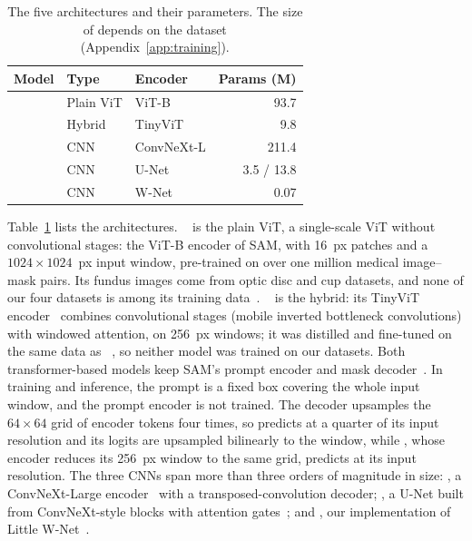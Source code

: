 \begin{table}[tb]
\caption{The five architectures and their parameters. The size of \convunext{} depends on the dataset (Appendix~\ref{app:training}).}
\label{tab:model_matrix}
\begin{ruledtabular}
\begin{tabular}{lllr}
Model & Type & Encoder & Params (M) \\
\midrule
\medsam{} & Plain ViT & ViT-B & 93.7 \\
\litemedsam{} & Hybrid & TinyViT & 9.8 \\
\convnext{} & CNN & ConvNeXt-L & 211.4 \\
\convunext{} & CNN & U-Net & 3.5 / 13.8 \\
\lwnet{} & CNN & W-Net & 0.07 \\
\end{tabular}
\end{ruledtabular}
\end{table}

Table~\ref{tab:model_matrix} lists the architectures. \medsam{}~\cite{ma2024segment} is the plain ViT, a single-scale ViT without convolutional stages: the ViT-B encoder of SAM, with 16~px patches and a $1024 \times 1024$~px input window, pre-trained on over one million medical image--mask pairs. Its fundus images come from optic disc and cup datasets, and none of our four datasets is among its training data~\cite{ma2024segment}. \litemedsam{}~\cite{ma2024efficient} is the hybrid: its TinyViT encoder~\cite{wu2022tinyvit} combines convolutional stages (mobile inverted bottleneck convolutions) with windowed attention, on 256~px windows; it was distilled and fine-tuned on the same data as \medsam{}~\cite{ma2024efficient}, so neither model was trained on our datasets. Both transformer-based models keep SAM's prompt encoder and mask decoder~\cite{Kirillov_2023_ICCV}. In training and inference, the prompt is a fixed box covering the whole input window, and the prompt encoder is not trained. The decoder upsamples the $64 \times 64$ grid of encoder tokens four times, so \medsam{} predicts at a quarter of its input resolution and its logits are upsampled bilinearly to the window, while \litemedsam{}, whose encoder reduces its 256~px window to the same grid, predicts at its input resolution. The three CNNs span more than three orders of magnitude in size: \convnext{}, a ConvNeXt-Large encoder~\cite{liu2022convnet} with a transposed-convolution decoder; \convunext{}, a U-Net built from ConvNeXt-style blocks with attention gates~\cite{han2022convunext}; and \lwnet{}, our implementation of Little W-Net~\cite{galdran2020littlewnetcouldstateoftheart}.

